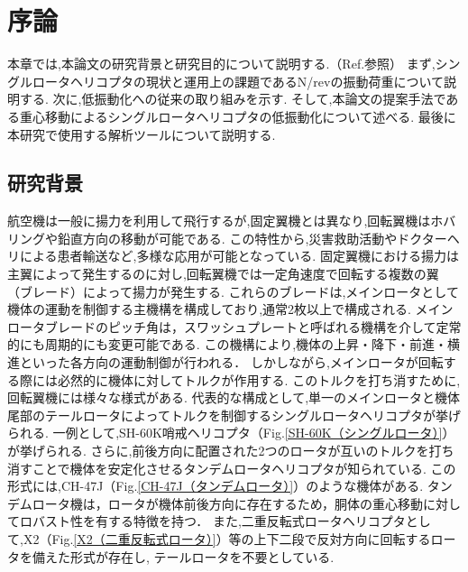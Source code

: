 \chapter{序論}
\label{chap:intro}
\begin{flushright}
	\begin{minipage}{0.8\hsize}
		\quad 本章では,本論文の研究背景と研究目的について説明する.（Ref.\cite{Yoshizaki_master}参照）
		      まず,シングルロータヘリコプタの現状と運用上の課題であるN/revの振動荷重について説明する.
              次に,低振動化への従来の取り組みを示す.
              そして,本論文の提案手法である重心移動によるシングルロータヘリコプタの低振動化について述べる.
              最後に本研究で使用する解析ツールについて説明する.
	\end{minipage}
\end{flushright}
    \section{研究背景}
    \label{sec:research_background}
    \par
    航空機は一般に揚力を利用して飛行するが,固定翼機とは異なり,回転翼機はホバリングや鉛直方向の移動が可能である.
    この特性から,災害救助活動やドクターヘリによる患者輸送など,多様な応用が可能となっている.
    固定翼機における揚力は主翼によって発生するのに対し,回転翼機では一定角速度で回転する複数の翼（ブレード）によって揚力が発生する.
    これらのブレードは,メインロータとして機体の運動を制御する主機構を構成しており,通常2枚以上で構成される.
    メインロータブレードのピッチ角は，スワッシュプレートと呼ばれる機構を介して定常的にも周期的にも変更可能である.
    この機構により,機体の上昇・降下・前進・横進といった各方向の運動制御が行われる．
    しかしながら,メインロータが回転する際には必然的に機体に対してトルクが作用する.
    このトルクを打ち消すために,回転翼機には様々な様式がある.
    代表的な構成として,単一のメインロータと機体尾部のテールロータによってトルクを制御するシングルロータヘリコプタが挙げられる.
    一例として,SH-60K哨戒ヘリコプタ（Fig.\ref{SH-60K（シングルロータ）}）が挙げられる.
    さらに,前後方向に配置された2つのロータが互いのトルクを打ち消すことで機体を安定化させるタンデムロータヘリコプタが知られている.
    この形式には,CH-47J（Fig.\ref{CH-47J（タンデムロータ）}）のような機体がある.
    タンデムロータ機は，ロータが機体前後方向に存在するため，胴体の重心移動に対してロバスト性を有する特徴を持つ．
    また,二重反転式ロータヘリコプタとして,X2（Fig.\ref{X2（二重反転式ロータ）}）等の上下二段で反対方向に回転するロータを備えた形式が存在し,
    テールロータを不要としている.
